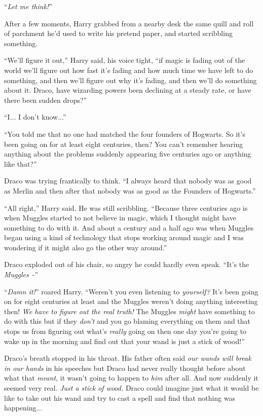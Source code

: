 ``\emph{Let me think!}''

After a few moments, Harry grabbed from a nearby desk the same quill and roll of parchment he'd used to write his pretend paper, and started scribbling something.

``We'll figure it out,'' Harry said, his voice tight, ``if magic is fading out of the world we'll figure out how fast it's fading and how much time we have left to do something, and then we'll figure out why it's fading, and then we'll do something about it. Draco, have wizarding powers been declining at a steady rate, or have there been sudden drops?''

``I... I don't know...''

``You told me that no one had matched the four founders of Hogwarts. So it's been going on for at least eight centuries, then? You can't remember hearing anything about the problems suddenly appearing five centuries ago or anything like that?''

Draco was trying frantically to think. ``I always heard that nobody was as good as Merlin and then after that nobody was as good as the Founders of Hogwarts.''

``All right,'' Harry said. He was still scribbling. ``Because three centuries ago is when Muggles started to not believe in magic, which I thought might have something to do with it. And about a century and a half ago was when Muggles began using a kind of technology that stops working around magic and I was wondering if it might also go the other way around.''

Draco exploded out of his chair, so angry he could hardly even speak. ``It's the \emph{Muggles}~-''

``\emph{Damn it!}'' roared Harry. ``Weren't you even listening to \emph{yourself?} It's been going on for eight centuries at least and the Muggles weren't doing anything interesting then! \emph{We have to figure out the real truth!} The Muggles \emph{might} have something to do with this but if they \emph{don't} and you go blaming everything on them and that stops us from figuring out what's \emph{really} going on then one day you're going to wake up in the morning and find out that your wand is just a stick of wood!''

Draco's breath stopped in his throat. His father often said \emph{our wands will break in our hands} in his speeches but Draco had never really thought before about what that \emph{meant}, it wasn't going to happen to \emph{him} after all. And now suddenly it seemed very real. \emph{Just a stick of wood.} Draco could imagine just what it would be like to take out his wand and try to cast a spell and find that nothing was happening...

